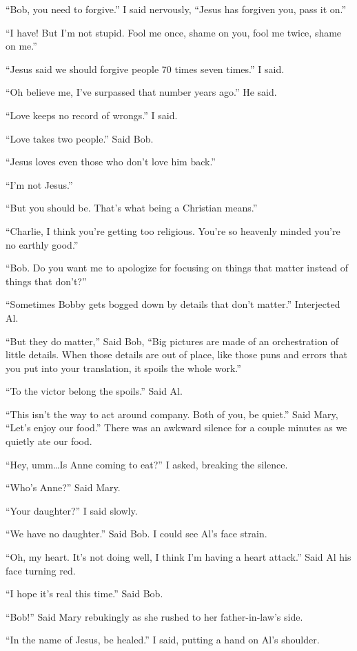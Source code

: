 ``Bob, you need to forgive.'' I said nervously, ``Jesus has forgiven you, pass it on.''

``I have! But I'm not stupid. Fool me once, shame on you, fool me twice, shame on me.''

``Jesus said we should forgive people 70 times seven times.'' I said.

``Oh believe me, I've surpassed that number years ago.'' He said.

``Love keeps no record of wrongs.'' I said.

``Love takes two people.'' Said Bob.

``Jesus loves even those who don't love him back.''

``I'm not Jesus.''

``But you should be. That's what being a Christian means.''

``Charlie, I think you're getting too religious. You're so heavenly minded you're no earthly good.''

``Bob. Do you want me to apologize for focusing on things that matter instead of things that don't?''

``Sometimes Bobby gets bogged down by details that don't matter.'' Interjected Al.

``But they do matter,'' Said Bob, ``Big pictures are made of an orchestration of little details. When those details are out of place, like those puns and errors that you put into your translation, it spoils the whole work.''

``To the victor belong the spoils.'' Said Al.

``This isn't the way to act around company. Both of you, be quiet.'' Said Mary, ``Let's enjoy our food.'' There was an awkward silence for a couple minutes as we quietly ate our food.

``Hey, umm\ldots Is Anne coming to eat?'' I asked, breaking the silence.

``Who's Anne?'' Said Mary.

``Your daughter?'' I said slowly.

``We have no daughter.'' Said Bob. I could see Al's face strain.

``Oh, my heart. It's not doing well, I think I'm having a heart attack.'' Said Al his face turning red.

``I hope it's real this time.'' Said Bob.

``Bob!'' Said Mary rebukingly as she rushed to her father-in-law's side.

``In the name of Jesus, be healed.'' I said, putting a hand on Al's shoulder.

